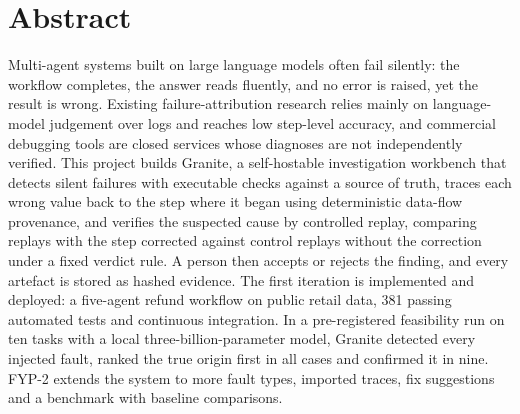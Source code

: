 \chapter*{Abstract}

Multi-agent systems built on large language models often fail silently: the workflow completes, the answer reads fluently, and no error is raised, yet the result is wrong. Existing failure-attribution research relies mainly on language-model judgement over logs and reaches low step-level accuracy, and commercial debugging tools are closed services whose diagnoses are not independently verified. This project builds Granite, a self-hostable investigation workbench that detects silent failures with executable checks against a source of truth, traces each wrong value back to the step where it began using deterministic data-flow provenance, and verifies the suspected cause by controlled replay, comparing replays with the step corrected against control replays without the correction under a fixed verdict rule. A person then accepts or rejects the finding, and every artefact is stored as hashed evidence. The first iteration is implemented and deployed: a five-agent refund workflow on public retail data, 381 passing automated tests and continuous integration. In a pre-registered feasibility run on ten tasks with a local three-billion-parameter model, Granite detected every injected fault, ranked the true origin first in all cases and confirmed it in nine. FYP-2 extends the system to more fault types, imported traces, fix suggestions and a benchmark with baseline comparisons.
